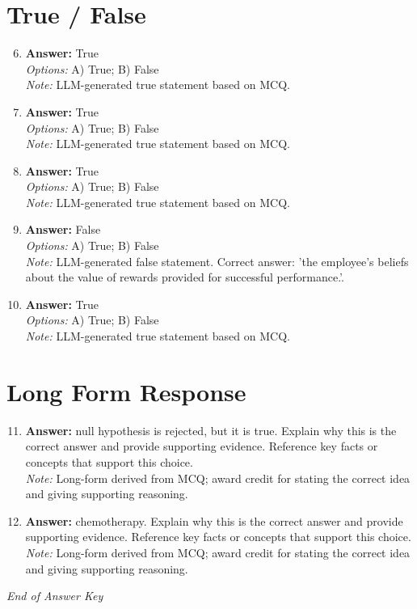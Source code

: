 \documentclass[12pt]{article}
\begin{document}
\section*{True / False}
\begin{enumerate}[label=\arabic*.]
\setcounter{enumi}{5}
\item \textbf{Answer:} True
\\ \textit{Options:} A) True; B) False
\\ \textit{Note:} LLM-generated true statement based on MCQ.
\item \textbf{Answer:} True
\\ \textit{Options:} A) True; B) False
\\ \textit{Note:} LLM-generated true statement based on MCQ.
\item \textbf{Answer:} True
\\ \textit{Options:} A) True; B) False
\\ \textit{Note:} LLM-generated true statement based on MCQ.
\item \textbf{Answer:} False
\\ \textit{Options:} A) True; B) False
\\ \textit{Note:} LLM-generated false statement. Correct answer: 'the employee's beliefs about the value of rewards provided for successful performance.'.
\item \textbf{Answer:} True
\\ \textit{Options:} A) True; B) False
\\ \textit{Note:} LLM-generated true statement based on MCQ.
\end{enumerate}

\section*{Long Form Response}
\begin{enumerate}[label=\arabic*.]
\setcounter{enumi}{10}
\item \textbf{Answer:} null hypothesis is rejected, but it is true. Explain why this is the correct answer and provide supporting evidence. Reference key facts or concepts that support this choice.
\\ \textit{Note:} Long-form derived from MCQ; award credit for stating the correct idea and giving supporting reasoning.
\item \textbf{Answer:} chemotherapy. Explain why this is the correct answer and provide supporting evidence. Reference key facts or concepts that support this choice.
\\ \textit{Note:} Long-form derived from MCQ; award credit for stating the correct idea and giving supporting reasoning.
\end{enumerate}

\vfill
\noindent\textit{End of Answer Key}
\end{document}
